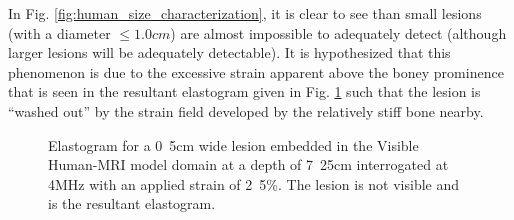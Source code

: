 			In Fig. \ref{fig:human_size_characterization}, it is clear to see than small lesions (with a diameter $\leq \unit{1.0}{cm}$) are almost impossible to adequately detect (although larger lesions will be adequately detectable). It is hypothesized that this phenomenon is due to the excessive strain apparent above the boney prominence that is seen in the resultant elastogram given in Fig. \ref{fig:human_elastogram} such that the lesion is ``washed out'' by the strain field developed by the relatively stiff bone nearby.

			\begin{figure}[!t]
				\centering
				\caption{Elastogram for a \unit{0.5}{cm} wide lesion embedded in the Visible Human-MRI model domain at a depth of \unit{7.25}{cm} interrogated at \unit{4}{MHz} with an applied strain of \unit{2.5}{\%}. The lesion is not visible and is the resultant elastogram.}
				\label{fig:human_elastogram}
			\end{figure}

